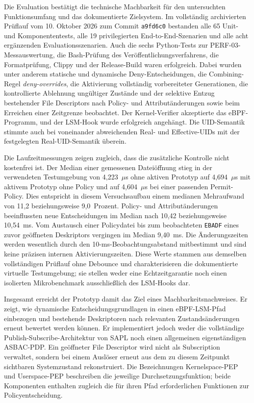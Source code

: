 Die Evaluation bestätigt die technische Machbarkeit für den untersuchten Funktionsumfang und das dokumentierte Zielsystem. Im vollständig archivierten Prüflauf vom 10. Oktober 2026 zum Commit \texttt{a9fd6c0} bestanden alle 65 Unit- und Komponententests, alle 19 privilegierten End-to-End-Szenarien und alle acht ergänzenden Evaluationsszenarien. Auch die sechs Python-Tests zur PERF-03-Messauswertung, die Bash-Prüfung des Veröffentlichungsverfahrens, die Formatprüfung, Clippy und der Release-Build waren erfolgreich. Dabei wurden unter anderem statische und dynamische Deny-Entscheidungen, die Combining-Regel \emph{deny-overrides}, die Aktivierung vollständig vorbereiteter Generationen, die kontrollierte Ablehnung ungültiger Zustände und der selektive Entzug bestehender File Descriptors nach Policy- und Attributänderungen sowie beim Erreichen einer Zeitgrenze beobachtet. Der Kernel-Verifier akzeptierte das eBPF-Programm, und der LSM-Hook wurde erfolgreich angehängt. Die UID-Semantik stimmte auch bei voneinander abweichenden Real- und Effective-UIDs mit der festgelegten Real-UID-Semantik überein.

Die Laufzeitmessungen zeigen zugleich, dass die zusätzliche Kontrolle nicht kostenfrei ist. Der Median einer gemessenen Dateiöffnung stieg in der verwendeten Testumgebung von 4,223~$\mu$s ohne aktiven Prototyp auf 4,694~$\mu$s mit aktivem Prototyp ohne Policy und auf 4,604~$\mu$s bei einer passenden Permit-Policy. Dies entspricht in diesem Versuchsaufbau einem medianen Mehraufwand von 11,2 beziehungsweise 9,0~Prozent. Policy- und Attributänderungen beeinflussten neue Entscheidungen im Median nach 10,42 beziehungsweise 10,54~ms. Vom Austausch einer Policydatei bis zum beobachteten \texttt{EBADF} eines zuvor geöffneten Deskriptors vergingen im Median 9,40~ms. Die Änderungszeiten werden wesentlich durch den 10-ms-Beobachtungsabstand mitbestimmt und sind keine präzisen internen Aktivierungszeiten. Diese Werte stammen aus demselben vollständigen Prüflauf ohne Debounce und charakterisieren die dokumentierte virtuelle Testumgebung; sie stellen weder eine Echtzeitgarantie noch einen isolierten Mikrobenchmark ausschließlich des LSM-Hooks dar.

Insgesamt erreicht der Prototyp damit das Ziel eines Machbarkeitsnachweises. Er zeigt, wie dynamische Entscheidungsgrundlagen in einen eBPF-LSM-Pfad einbezogen und bestehende Deskriptoren nach relevanten Zustandsänderungen erneut bewertet werden können. Er implementiert jedoch weder die vollständige Publish-Subscribe-Architektur von SAPL noch einen allgemeinen eigenständigen ASBAC-PDP. Ein geöffneter File Descriptor wird nicht als Subscription verwaltet, sondern bei einem Auslöser erneut aus dem zu diesem Zeitpunkt sichtbaren Systemzustand rekonstruiert. Die Bezeichnungen Kernelspace-PEP und Userspace-PEP beschreiben die jeweilige Durchsetzungsfunktion; beide Komponenten enthalten zugleich die für ihren Pfad erforderlichen Funktionen zur Policyentscheidung.

